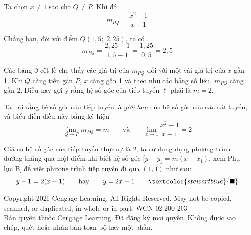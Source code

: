 \begin{minipage}[t]{133.9mm}
  Ta chọn $x \neq 1$ sao cho $Q \neq P$. Khi đó
  \[
  m_{PQ} = \frac{x^2 - 1}{x - 1}
  \]

  Chẳng hạn, đối với điểm $Q(1{,}5;\; 2{,}25)$, ta có
  \[
  m_{PQ} = \frac{2{,}25 - 1}{1{,}5 - 1} = \frac{1{,}25}{0{,}5} = 2{,}5
  \]

  Các bảng ở cột lề cho thấy các giá trị của $m_{PQ}$ đối với một vài giá trị của $x$ gần 1. Khi $Q$ càng tiến gần $P$, $x$ càng gần 1 và theo như các bảng số liệu, $m_{PQ}$ càng gần 2. Điều này gợi ý rằng hệ số góc của tiếp tuyến $\ell$ phải là $m = 2$.

  Ta nói rằng hệ số góc của tiếp tuyến là \emph{giới hạn} của hệ số góc của các cát tuyến, và biểu diễn điều này bằng ký hiệu
  \[
  \lim_{Q \to P} m_{PQ} = m \qquad\text{và}\qquad \lim_{x \to 1} \frac{x^2 - 1}{x - 1} = 2
  \]

  Giả sử hệ số góc của tiếp tuyến thực sự là 2, ta sử dụng dạng phương trình đường thẳng qua một điểm khi biết hệ số góc [$y - y_1 = m(x - x_1)$, xem Phụ lục B] để viết phương trình tiếp tuyến đi qua $(1, 1)$ như sau:
  \[
  y - 1 = 2(x - 1) \qquad\text{hay}\qquad y = 2x - 1 \tag*{$\textcolor{stewartblue}{\blacksquare}$}
  \]
\end{minipage}

\vfill
\begin{center}
{\fontsize{6.5}{8}\selectfont\color{gray}
Copyright 2021 Cengage Learning. All Rights Reserved. May not be copied, scanned, or duplicated, in whole or in part. WCN 02-200-203\\ 
Bản quyền thuộc Cengage Learning. Đã đăng ký mọi quyền. Không được sao chép, quét hoặc nhân bản toàn bộ hay một phần.
}
\end{center}
